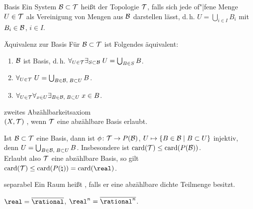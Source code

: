 \linie

\begin{Def}{Basis}
    Ein System $\mathcal{B} \subset \mathcal{T}$ heißt  der Topologie $\mathcal{T}$, falls
    sich jede of"|fene Menge $U \in \mathcal{T}$ als Vereinigung von Mengen aus $\mathcal{B}$
    darstellen lässt, d.\,h. $U = \bigcup_{i \in I} B_i$ mit $B_i \in \mathcal{B}$,
    $i \in I$.
\end{Def}

\begin{Satz}{Äquivalenz zur Basis}
    Für $\mathcal{B} \subset \mathcal{T}$ ist Folgendes äquivalent:
    \begin{enumerate}
        \item
        $\mathcal{B}$ ist Basis, d.\,h.
        $\forall_{U \in \mathcal{T}} \exists_{S \subset \mathcal{B}}\; U = \bigcup_{B \in S} B$.

        \item
        $\forall_{U \in \mathcal{T}}\; U = \bigcup_{B \in \mathcal{B},\; B \subset U} B$.

        \item
        $\forall_{U \in \mathcal{T}} \forall_{x \in U}
        \exists_{B \in \mathcal{B},\; B \subset U}\; x \in B$.
    \end{enumerate}
\end{Satz}

\linie

\begin{Def}{zweites Abzählbarkeitsaxiom} \\
    $(X, \mathcal{T})$ , wenn $\mathcal{T}$ eine
    abzählbare Basis erlaubt.
\end{Def}

\begin{Kor}
    Ist $\mathcal{B} \subset \mathcal{T}$ eine Basis, dann ist
    $\phi\colon \mathcal{T} \rightarrow P(\mathcal{B})$,
    $U \mapsto \{B \in \mathcal{B} \;|\; B \subset U\}$
    injektiv, denn $U = \bigcup_{B \in \mathcal{B},\; B \subset U} B$.
    Insbesondere ist $\operatorname{card}(\mathcal{T}) \le \operatorname{card}(P(\mathcal{B}))$. \\
    Erlaubt also $\mathcal{T}$ eine abzählbare Basis, so gilt
    $\card(\T) \le \card(P(\natural)) = \card(\real)$.
\end{Kor}

\begin{Def}{separabel}
    Ein Raum heißt , falls er eine abzählbare dichte
    Teilmenge besitzt.
\end{Def}

\begin{Bsp}
    $\real = \abschluss{\rational}$,
    $\real^n = \abschluss{\rational^n}$.
\end{Bsp}

